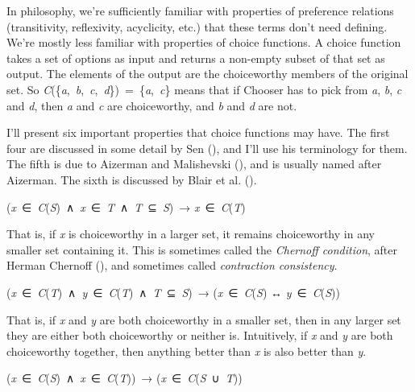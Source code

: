 \documentclass[
  10.5pt,
  twoside]{article}
\providecommand{\tightlist}{%
  \setlength{\itemsep}{0pt}\setlength{\parskip}{0pt}}
\let\olddescription\description
\let\endolddescription\enddescription
\renewenvironment{description}
  {\vskip 5pt\olddescription}
  {\endolddescription\vskip 5pt}
\begin{document}
In philosophy, we're sufficiently familiar with properties of preference
relations (transitivity, reflexivity, acyclicity, etc.) that these terms
don't need defining. We're mostly less familiar with properties of
choice functions. A choice function takes a set of options as input and
returns a non-empty subset of that set as output. The elements of the
output are the choiceworthy members of the original set. So
\emph{C}(\{\emph{a},~\emph{b},~\emph{c},~\emph{d}\})~=~\{\emph{a},~\emph{c}\}
means that if Chooser has to pick from \emph{a}, \emph{b}, \emph{c} and
\emph{d}, then \emph{a} and \emph{c} are choiceworthy, and \emph{b} and
\emph{d} are not.

I'll present six important properties that choice functions may have.
The first four are discussed in some detail by Sen
(), and I'll use his
terminology for them. The fifth is due to Aizerman and Malishevski
(), and is usually named after
Aizerman. The sixth is discussed by Blair et al.
().

\begin{description}
\tightlist
\item[Property α]
(\emph{x}~∈~\emph{C}(\emph{S})~∧~\emph{x}~∈~\emph{T}~∧~\emph{T}~⊆~\emph{S})~→
\emph{x}~∈~\emph{C}(\emph{T})
\end{description}

That is, if \emph{x} is choiceworthy in a larger set, it remains
choiceworthy in any smaller set containing it. This is sometimes called
the \emph{Chernoff condition}, after Herman Chernoff
(), and sometimes called
\emph{contraction consistency}.

\begin{description}
\tightlist
\item[Property β]
(\emph{x}~∈~\emph{C}(\emph{T})~∧~\emph{y}~∈~\emph{C}(\emph{T})~∧~\emph{T}~⊆~\emph{S})~→
(\emph{x}~∈~\emph{C}(\emph{S}) ↔ \emph{y}~∈~\emph{C}(\emph{S}))
\end{description}

That is, if \emph{x} and \emph{y} are both choiceworthy in a smaller
set, then in any larger set they are either both choiceworthy or neither
is. Intuitively, if \emph{x} and \emph{y} are both choiceworthy
together, then anything better than \emph{x} is also better than
\emph{y}.

\begin{description}
\tightlist
\item[Property γ]
(\emph{x}~∈~\emph{C}(\emph{S})~∧~\emph{x}~∈~\emph{C}(\emph{T}))~→
(\emph{x}~∈~\emph{C}(\emph{S}~∪~\emph{T}))
\end{description}
\end{document}
